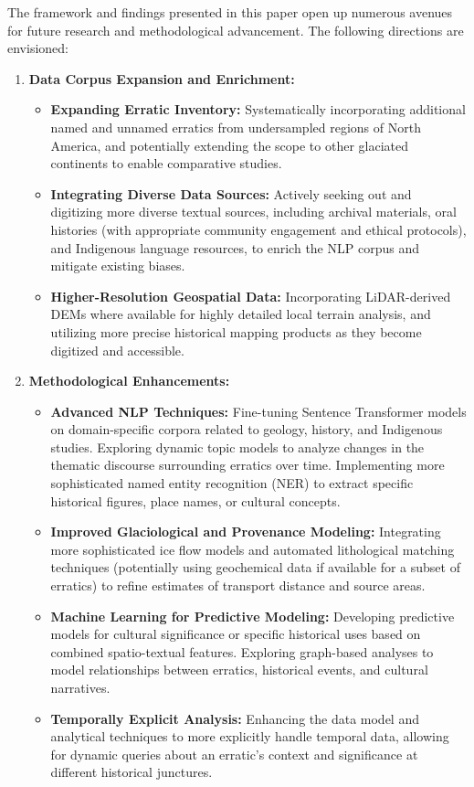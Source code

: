 \documentclass[
11pt, %
english, %
singlespacing, %
headsepline, %
]{MastersDoctoralThesis} %
\begin{document}
The framework and findings presented in this paper open up numerous avenues for future research and methodological advancement. The following directions are envisioned:

\begin{enumerate}
    \item \textbf{Data Corpus Expansion and Enrichment:}
        \begin{itemize}
            \item \textbf{Expanding Erratic Inventory:} Systematically incorporating additional named and unnamed erratics from undersampled regions of North America, and potentially extending the scope to other glaciated continents to enable comparative studies.
            \item \textbf{Integrating Diverse Data Sources:} Actively seeking out and digitizing more diverse textual sources, including archival materials, oral histories (with appropriate community engagement and ethical protocols), and Indigenous language resources, to enrich the NLP corpus and mitigate existing biases.
            \item \textbf{Higher-Resolution Geospatial Data:} Incorporating LiDAR-derived DEMs where available for highly detailed local terrain analysis, and utilizing more precise historical mapping products as they become digitized and accessible.
        \end{itemize}

    \item \textbf{Methodological Enhancements:}
        \begin{itemize}
            \item \textbf{Advanced NLP Techniques:} Fine-tuning Sentence Transformer models on domain-specific corpora related to geology, history, and Indigenous studies. Exploring dynamic topic models to analyze changes in the thematic discourse surrounding erratics over time. Implementing more sophisticated named entity recognition (NER) to extract specific historical figures, place names, or cultural concepts.
            \item \textbf{Improved Glaciological and Provenance Modeling:} Integrating more sophisticated ice flow models and automated lithological matching techniques (potentially using geochemical data if available for a subset of erratics) to refine estimates of transport distance and source areas.
            \item \textbf{Machine Learning for Predictive Modeling:} Developing predictive models for cultural significance or specific historical uses based on combined spatio-textual features. Exploring graph-based analyses to model relationships between erratics, historical events, and cultural narratives.
            \item \textbf{Temporally Explicit Analysis:} Enhancing the data model and analytical techniques to more explicitly handle temporal data, allowing for dynamic queries about an erratic's context and significance at different historical junctures.
        \end{itemize}


\end{enumerate}
\end{document}

